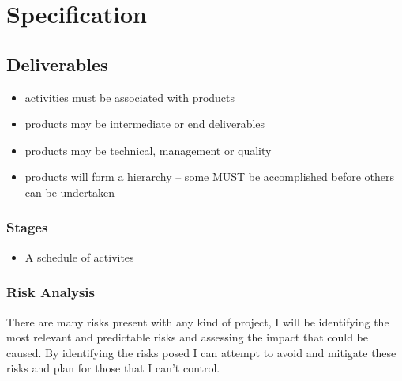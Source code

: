 \section{Specification}\label{specification}

\subsection{Deliverables}\label{deliverables}

\begin{itemize}
\tightlist
\item
  activities must be associated with products
\item
  products may be intermediate or end deliverables
\item
  products may be technical, management or quality
\item
  products will form a hierarchy -- some MUST be accomplished before
  others can be undertaken
\end{itemize}

\subsubsection{Stages}\label{stages}

\begin{itemize}
\tightlist
\item
  A schedule of activites
\end{itemize}

\subsubsection{Risk Analysis}\label{risk-analysis}

There are many risks present with any kind of project, I will be
identifying the most relevant and predictable risks and assessing the
impact that could be caused. By identifying the risks posed I can
attempt to avoid and mitigate these risks and plan for those that I
can't control.


